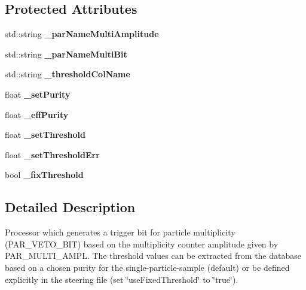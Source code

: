 \subsection*{Protected Attributes}
\begin{DoxyCompactItemize}
\item 
std\-::string {\bfseries \-\_\-par\-Name\-Multi\-Amplitude}\label{classCALICE_1_1MultiBitGenerator_a54e51e094c859d5d8cad2a4d70415f0b}

\item 
std\-::string {\bfseries \-\_\-par\-Name\-Multi\-Bit}\label{classCALICE_1_1MultiBitGenerator_a2bb683f37ffefd42472f002425c1e184}

\item 
std\-::string {\bfseries \-\_\-threshold\-Col\-Name}\label{classCALICE_1_1MultiBitGenerator_a3d60b874142243c3161a22980c5add5f}

\item 
float {\bfseries \-\_\-set\-Purity}\label{classCALICE_1_1MultiBitGenerator_acdfc8dc40d3b785d401f534432b60e90}

\item 
float {\bfseries \-\_\-eff\-Purity}\label{classCALICE_1_1MultiBitGenerator_aa7af704d7fb005ee5374f6fe6852e27c}

\item 
float {\bfseries \-\_\-set\-Threshold}\label{classCALICE_1_1MultiBitGenerator_abc65d8c030a287e6e052fdfecea254f9}

\item 
float {\bfseries \-\_\-set\-Threshold\-Err}\label{classCALICE_1_1MultiBitGenerator_a9920211244785075a271343b7a122448}

\item 
bool {\bfseries \-\_\-fix\-Threshold}\label{classCALICE_1_1MultiBitGenerator_aa4724d6a3ae84e58da8c24cab192e2ac}

\end{DoxyCompactItemize}


\subsection{Detailed Description}
Processor which generates a trigger bit for particle multiplicity (P\-A\-R\-\_\-\-V\-E\-T\-O\-\_\-\-B\-I\-T) based on the multiplicity counter amplitude given by P\-A\-R\-\_\-\-M\-U\-L\-T\-I\-\_\-\-A\-M\-P\-L. The threshold values can be extracted from the database based on a chosen purity for the single-\/particle-\/sample (default) or be defined explicitly in the steering file (set \char`\"{}use\-Fixed\-Threshold\char`\"{} to \char`\"{}true\char`\"{}).

